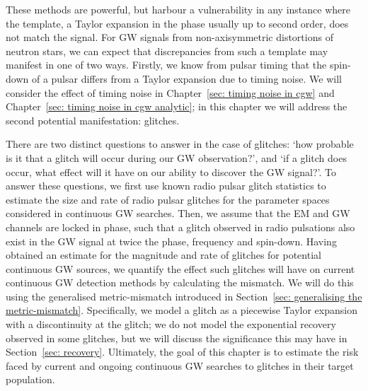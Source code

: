 \documentclass[../full_thesis/full_thesis.tex]{subfiles}
\begin{document}
These methods are powerful, but harbour a vulnerability in any instance where
the template, a Taylor expansion in the phase usually up to second order, does
not match the signal. For GW signals from non-axisymmetric distortions of neutron stars,
we can expect that discrepancies from such a template may manifest in one of
two ways. Firstly, we know from pulsar timing that the spin-down of a pulsar
differs from a Taylor expansion due to timing noise. We will
consider the effect of timing noise in Chapter~\ref{sec: timing noise in cgw}
and Chapter~\ref{sec: timing noise in cgw analytic};
in this chapter we will
address the second potential manifestation: glitches.

There are two distinct questions to answer in the case of glitches: `how
probable is it that a glitch will occur during our GW observation?', and `if a
glitch does occur, what effect will it have on our ability to discover the GW
signal?'. To answer these questions, we first use known radio pulsar glitch
statistics to estimate the size and rate of radio pulsar glitches for the
parameter spaces considered in continuous GW searches. Then, we assume that the
EM and GW channels are locked in phase, such that a glitch observed in radio
pulsations also exist in the GW signal at twice the phase, frequency and
spin-down. Having obtained an estimate for the magnitude and rate of glitches
for potential continuous GW sources, we quantify the effect such glitches will
have on current continuous GW detection methods by calculating the mismatch. We
will do this using the generalised metric-mismatch introduced in Section~\ref{sec:
generalising the metric-mismatch}. Specifically, we model a glitch as a
piecewise Taylor expansion with a discontinuity at the glitch; we do not model
the exponential recovery observed in some glitches, but we will discuss the
significance this may have in Section~\ref{sec: recovery}. Ultimately, the goal of
this chapter is to estimate the risk faced by current and ongoing continuous GW
searches to glitches in their target population.
\end{document}
